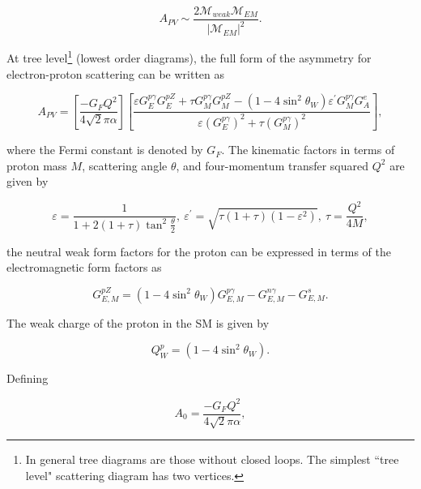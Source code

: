 \begin{equation} \label{equ:qweak3}
A_{PV} \sim \frac{2 \mathcal{M}_{weak} \mathcal{M}_{EM}}{\vert \mathcal{M}_{EM} \vert^{2}}.
\end{equation}

At tree level\footnote{In general tree diagrams are those without closed loops. The simplest ``tree level" scattering diagram has two vertices.} (lowest order diagrams), the full form of the asymmetry for electron-proton scattering can be written as~\cite{qweak_proposal_2007}

\begin{equation} \label{equ:qweak4}
A_{PV} = \left[ \frac{-G_{F}Q^{2}}{4 \sqrt{2}\pi\alpha} \right] \left[ \frac{{\varepsilon} {G_{E}^{p\gamma}}G_{E}^{pZ} + {\tau} {G_{M}^{p\gamma}}G_{M}^{pZ} - (1-4\sin^{2}\theta_{W}){\varepsilon^{\prime}}{G_{M}^{p\gamma}}{G_{A}^{e}} } { {\varepsilon}({G_{E}^{p\gamma}})^{2} + {\tau}({G_{M}^{p\gamma}})^{2} } \right],
\end{equation}

\noindent
where the Fermi constant is denoted by $G_{F}$. The kinematic factors in terms of proton mass $M$, scattering angle $\theta$, and four-momentum transfer squared $Q^{2}$ are given by

\begin{equation} \label{equ:qweak5}
{\varepsilon} = \frac{1}{1 + 2(1+{\tau})\tan^{2}\frac{\theta}{2}},~{\varepsilon^{\prime}} = \sqrt{{\tau}(1+{\tau})(1 - {\varepsilon}^{2})},~{\tau} = \frac{Q^{2}}{4M},
\end{equation}

\noindent
the neutral weak form factors for the proton can be expressed in terms of the electromagnetic form factors as

\begin{equation} \label{equ:qweak6}
G_{E,M}^{pZ} = (1 - 4\sin^{2} \theta_{W}) {G_{E,M}^{p\gamma}} - {G_{E,M}^{n\gamma}} - {G_{E,M}^{s}}.
\end{equation}

The weak charge of the proton in the SM is given by 

\begin{equation} \label{equ:qweak7}
Q_{W}^{p} = (1-4\sin^{2}\theta_{W}).
\end{equation}

\noindent
Defining 

\begin{equation} \label{equ:qweak8}
A_{0} = \frac{-G_{F}Q^{2}}{4 \sqrt{2}\pi\alpha},
\end{equation}


